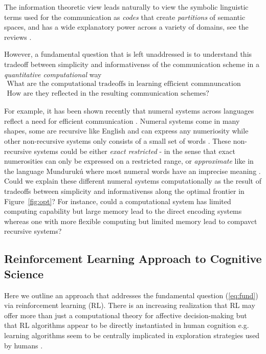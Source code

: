\documentclass{article}
\begin{document}
The information theoretic view leads naturally to view the symbolic linguistic terms used for the communication as \emph{codes} that create \emph{partitions} of semantic spaces, and has a wide explanatory power across a variety of domains, see the reviews \citet{Kemp2018, Gibson2019}. 


However, a fundamental question that is left unaddressed is to understand this tradeoff between simplicity and informativenss of the communication scheme in a \emph{quantitative computational} way
\begin{eqnarray}
  \label{eq:fund}  
  \mbox{What are the computational tradeoffs in learning efficient commnuncation schemes?} \nonumber \\
  \mbox{How are they reflected in the resulting communication schemes?}
\end{eqnarray}
 
For example, it has been shown recently that numeral systems across languages reflect a need for efficient communication \citep{Xu2020}. Numeral systems come in many shapes, some are recursive like English and can express any numeriosity while other non-recursive systems only consists of a small set of words \citep{wals-131}. These non-recursive systems could be either \emph{exact restricted} - in the sense that exact numerosities can only be expressed on a restricted range, or \emph{approximate} like in the language Mundurukú where most numeral words have an imprecise meaning \citep{Pica2004}. Could we explain these different numeral systems computationally as the result of tradeoffs  between simplicity and informativenss along the optimal frontier in Figure~\ref{fig:opt}? For instance, could a computational system has limited computing capability but large memory lead to the direct encoding systems whereas one with more flexible computing but limited memory lead to compavct recursive systems?


\subsection{Reinforcement Learning Approach to Cognitive Science} 
Here we outline an approach that addresses the fundamental question (\ref{eq:fund}) via reinforcement learning (RL). 
There is an increasing realization that RL may offer more than just a computational theory for affective decision-making but that RL algorithms appear to be directly instantiated in human cognition e.g. 
learning algorithms seem to be centrally implicated in exploration strategies used by humans \citep{Wilson2014, Schulz2019, Eckstein20}. 
\end{document}

